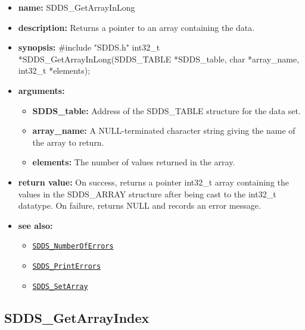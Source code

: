 \documentclass[11pt]{article}
\newcommand{\progref}[1]{\hyperref[SDDS_#1]{\tt SDDS\_#1}}
\begin{document}
\begin{itemize}
\item {\bf name:}\newline
SDDS\_GetArrayInLong
\item {\bf description:}\newline
Returns a pointer to an array containing the data.
\item {\bf synopsis:} \#include "SDDS.h"\newline
int32\_t *SDDS\_GetArrayInLong(SDDS\_TABLE *SDDS\_table, char *array\_name, int32\_t *elements);\newline
\item {\bf arguments:}
\begin{itemize}
\item {\bf SDDS\_table:} Address of the SDDS\_TABLE structure for the data set.
\item {\bf array\_name:} A NULL-terminated character string giving the name of the array to return.
\item {\bf elements:} The number of values returned in the array.
\end{itemize}
\item {\bf return value:}\newline
On success, returns a pointer int32\_t array containing the values in the SDDS\_ARRAY structure after being cast to the int32\_t datatype. On failure, returns NULL and records an error message. 
\item {\bf see also:}
\begin{itemize}
\item \progref{NumberOfErrors}
\item \progref{PrintErrors}
\item \progref{SetArray}
\end{itemize}
\end{itemize}

\subsection{SDDS\_GetArrayIndex}
\label{SDDS_GetArrayIndex}
\end{document}
